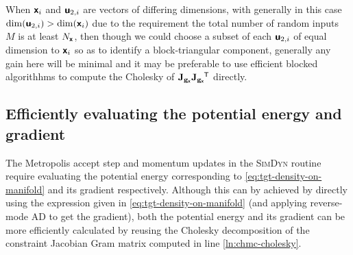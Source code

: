 When $\boldsymbol{\mathsf{x}}_i$ and $\boldsymbol{\mathsf{u}}_{2,i}$ are vectors of differing dimensions, with generally in this case $\dim(\boldsymbol{\mathsf{u}}_{2,i}) > \dim(\boldsymbol{\mathsf{x}}_{i})$ due to the requirement the total number of random inputs $M$ is at least $N_{\boldsymbol{\mathsf{x}}}$, then though we could choose a subset of each $\boldsymbol{\mathsf{u}}_{2,i}$ of equal dimension to $\boldsymbol{\mathsf{x}}_i$ so as to identify a block-triangular component, generally any gain here will be minimal and it may be preferable to use efficient blocked algorithhms to compute the Cholesky of $\mathbf{J}_{{\mathbf{g}}_{\boldsymbol{\mathsf{x}}}}\mathbf{J}_{{\mathbf{g}}_{\boldsymbol{\mathsf{x}}}}\phantom{}^{\mkern-1.5mu\mathsf{T}}$ directly.


\subsection[Evaluating the potential energy]{Efficiently evaluating the potential energy and gradient}

The Metropolis accept step and momentum updates in the \textsc{SimDyn} routine require evaluating the potential energy corresponding to \eqref{eq:tgt-density-on-manifold} and its gradient respectively. Although this can by achieved by directly using the expression given in \eqref{eq:tgt-density-on-manifold} (and applying reverse-mode \ac{AD} to get the gradient), both the potential energy and its gradient can be more efficiently calculated by reusing the Cholesky decomposition of the constraint Jacobian Gram matrix computed in line \ref{ln:chmc-cholesky}.

